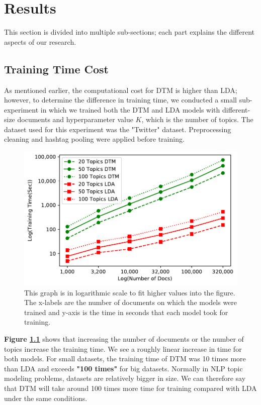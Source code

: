 \chapter{Results}
This section is divided into multiple sub-sections; each part explains the different aspects of our research.

\section{Training Time Cost}
As mentioned earlier, the computational cost for DTM is higher than LDA;  however, to determine the difference in training time, we conducted a small sub-experiment in which we trained both the DTM and LDA models with different-size documents and hyperparameter value $K$, which is the number of topics. The dataset used for this experiment was the "Twitter" dataset. Preprocessing cleaning and hashtag pooling were applied before training.

\begin{figure}[h!]
\begin{center}
\includegraphics[scale=0.8]{costGraph.pdf}
\caption{This graph is in logarithmic scale to fit higher values into the figure. The x-labels are the number of documents on which the models were trained and y-axis is the time in seconds that each model took for training.}
\label{fig:trainingTime}
\end{center}
\end{figure}

\textbf{Figure \ref{fig:trainingTime}} shows that increasing the number of documents or the number of topics increase the training time. We see a roughly linear increase in time for both models. For small datasets, the training time of DTM was 10 times more than LDA and exceeds \textbf{"100 times"} for big datasets. Normally in NLP topic modeling problems, datasets are relatively bigger in size. We can therefore say that DTM will take around 100 times more time for training compared with LDA under the same conditions.

